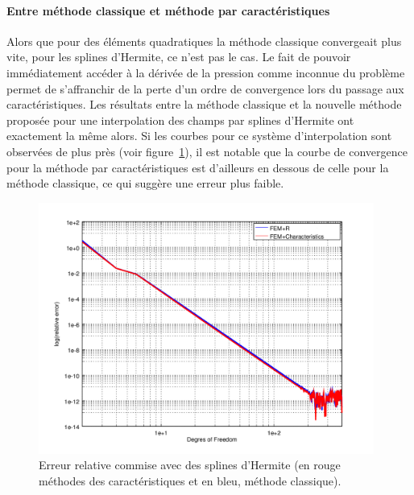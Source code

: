 \paragraph{Entre méthode classique et méthode par caractéristiques}
Alors que pour des éléments quadratiques la méthode classique convergeait plus vite, pour les splines d'Hermite, ce
n'est pas le cas.
Le fait de pouvoir immédiatement accéder à la dérivée de la pression comme inconnue du problème permet de s'affranchir
de la perte d'un ordre de convergence lors du passage aux caractéristiques. Les résultats entre la méthode classique et
la nouvelle méthode proposée pour une interpolation des champs par splines d'Hermite ont exactement la même alors. Si
les courbes pour ce système d'interpolation sont observées de plus près (voir figure~\ref{fig:herm_seul}), il est
notable que la courbe de convergence pour la méthode par caractéristiques est d'ailleurs en dessous de celle pour la
méthode classique, ce qui suggère une erreur plus faible.

\begin{figure}[!ht]
	\centering
	\includegraphics[width=11cm]{part4/figs/herm_seul.png}
	\caption{\label{fig:herm_seul}Erreur relative commise avec des splines d'Hermite (en rouge méthodes des
    caractéristiques et en bleu, méthode classique).}
\end{figure}
